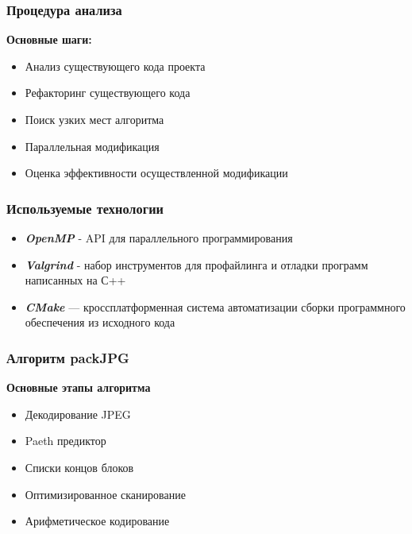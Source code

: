 \documentclass{beamer}
\begin{document}
\begin{frame}\frametitle{Процедура анализа}
    \textbf{Основные шаги:}
    \begin{itemize}
        \item{Анализ существующего кода проекта}
        \item{Рефакторинг существующего кода}
        \item{Поиск узких мест алгоритма}
        \item{Параллельная модификация}
        \item{Оценка эффективности осуществленной модификации}
    \end{itemize}
\end{frame}


\begin{frame}\frametitle{Используемые технологии}
    \begin{itemize}
        \item{\textbf{\emph{OpenMP}} - API для параллельного программирования}
        \item{\textbf{\emph{Valgrind}} - набор инструментов для профайлинга и отладки программ написанных на С++}
        \item{\textbf{\emph{CMake}} --- кроссплатформенная система автоматизации сборки программного обеспечения
         из исходного кода}
    \end{itemize}
\end{frame}


\begin{frame}[c]\frametitle{Алгоритм packJPG}

\vspace{\baselineskip}

\textbf{Основные этапы алгоритма}
\begin{itemize}
    \item{Декодирование JPEG}
    \item{Paeth предиктор}
    \item{Списки концов блоков}
    \item{Оптимизированное сканирование}
    \item{Арифметическое кодирование}
\end{itemize}

\end{frame}
\end{document}
